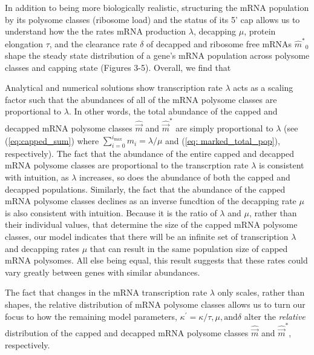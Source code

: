 \documentclass[review]{elsarticle}
\newcommand\mmpar[1]{\marginpar{\begin{spacing}{0.7}\raggedright \singlespacing \tiny \textbf{M:} #1 \end{spacing}}}  %
\newcommand{\imax}{\ensuremath{{i_{\max}}}\xspace}
\newcommand{\kappaprime}{\ensuremath{\kappa^{\prime}}\xspace}
\newcommand{\mhat}{\ensuremath{\hat{m}}\xspace}
\newcommand{\mhatstar}{\ensuremath{\mhat^{*}}\xspace}
\newcommand{\mvec}{\ensuremath{\vec{m}}\xspace}
\newcommand{\mvechat}{\ensuremath{\hat{\mvec}}\xspace}
\newcommand{\mvechatstar}{\ensuremath{\mvechat^*}\xspace}
\begin{document}
In addition to being more biologically realistic, structuring the mRNA population by its polysome classes (ribosome load) and the status of its 5' cap allows us to understand how the the rates mRNA production $\lambda$, decapping $\mu$, protein elongation $\tau$, and the clearance rate $\delta$ of decapped and ribosome free mRNAs $\mhatstar_0$ shape the steady state distribution of a gene's mRNA population across polysome classes and capping state (Figures 3-5).
Overall, we find that 


Analytical and numerical solutions show transcription rate $\lambda$ acts as a scaling factor such that the abundances
  of all of the mRNA polysome classes are proportional to $\lambda$.
  In other words, the total abundance of the capped and decapped mRNA polysome classes $\mvechat$ and $\mvechatstar$ are simply proportional to $\lambda$ (see (\ref{eq:capped_sum}) where $\sum_{i = 0} ^\imax m_i = \lambda/\mu$ and (\ref{eq: marked_total_pop}), respectively).
  The fact that the abundance of the entire capped and decapped mRNA polysome classes are proportional to the transcrption rate $\lambda$ is consistent with intuition, as $\lambda$ increases, so does the abundance of both the capped and decapped populations.
  Similarly, the fact that the abundance of the capped mRNA polysome classes declines as an inverse funcdtion of the decapping rate $\mu$ is also consistent with intuition.
  Because it is the ratio of $\lambda$ and $\mu$, rather than their individual values, that determine the size of the capped mRNA polysome classes, our model indicates that there will be an infinite set of transcription $\lambda$ and decapping rates $\mu$ that can result in the same population size of capped mRNA polysomes.
  All else being equal, this result suggests that these rates could vary greatly between genes with similar abundances.


The fact that changes in the mRNA transcription rate  $\lambda$ only scales, rather than shapes, the relative distribution of mRNA polysome classes allows us to turn our focus to how the remaining model parameters, $\kappaprime = \kappa/\tau, \mu, \text{and} \delta$ alter the \emph{relative} distribution of the capped and decapped mRNA polysome classes \mvechat and \mvechatstar, respectively.
\end{document}
